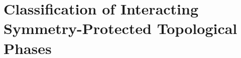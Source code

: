 \section{Classification of Interacting Symmetry-Protected Topological Phases}
\label{sec:chap19_sec3}


